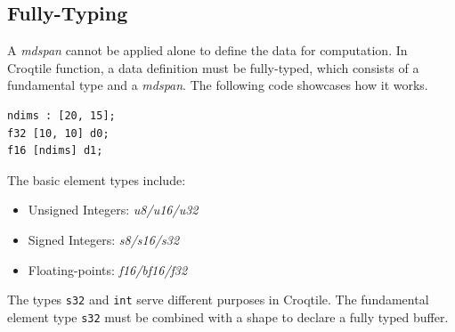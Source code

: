 \subsection*{Fully-Typing}

A \emph{mdspan} cannot be applied alone to define the data for computation. In Croqtile function, a data definition must be fully-typed, which consists of a fundamental type and a \emph{mdspan}. The following code showcases how it works.

\begin{lstlisting}[language=croqtile,caption={Complete Types}]
ndims : [20, 15];
f32 [10, 10] d0;
f16 [ndims] d1;
\end{lstlisting}

The basic element types include:

\begin{itemize}[leftmargin=1.6em]
\item Unsigned Integers: \emph{u8/u16/u32}
\item Signed Integers: \emph{s8/s16/s32}
\item Floating-points: \emph{f16/bf16/f32}
\end{itemize}

The types \texttt{s32} and \texttt{int} serve different purposes in Croqtile. The fundamental element type \texttt{s32} must be combined with a shape to declare a fully typed buffer.
